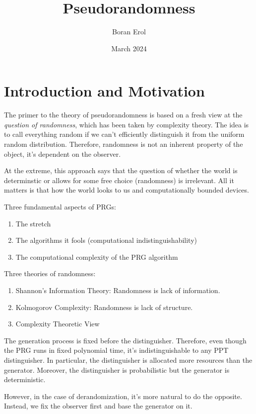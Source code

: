 \documentclass{article}
\title{Pseudorandomness}
\date{March 2024}
\author{Boran Erol}
\theoremstyle{definition}
\begin{document}
\maketitle

\section{Introduction and Motivation}

The primer to the theory of pseudorandomness is based on a fresh view 
at the \textit{question of randomness}, which has been taken by complexity
theory. The idea is to call everything random if we can't efficiently
distinguish it from the uniform random distribution. Therefore, randomness 
is not an inherent property of the object, it's dependent on the observer.

At the extreme, this approach says that the question of whether the world
is determinstic or allows for some free choice (randomness) is irrelevant.
All it matters is that how the world looks to us and computationally bounded
devices.

Three fundamental aspects of PRGs:

\begin{enumerate}
    \item The stretch
    \item The algorithms it fools (computational indistinguishability)
    \item The computational complexity of the PRG algorithm
\end{enumerate}

Three theories of randomness:

\begin{enumerate}
    \item Shannon's Information Theory: Randomness is lack of information.
    \item Kolmogorov Complexity: Randomness is lack of structure.
    \item Complexity Theoretic View
\end{enumerate}

The generation process is fixed before the distinguisher. Therefore, even though
the PRG runs in fixed polynomial time, it's indistinguishable to any
PPT distinguisher. In particular, the distinguisher is allocated more
resources than the generator. Moreover, the distinguisher is probabilistic
but the generator is deterministic.

However, in the case of derandomization, it's more natural to do the opposite.
Instead, we fix the observer first and base the generator on it.
\end{document}
